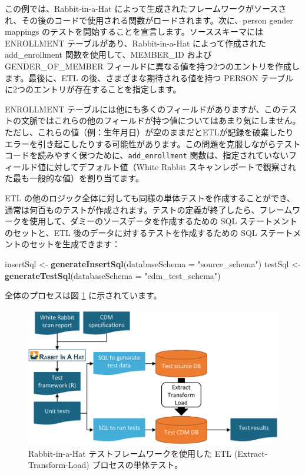 \documentclass[
  11pt]{book}
\newenvironment{Shaded}{\begin{snugshade}}{\end{snugshade}}
\newcommand{\AttributeTok}[1]{\textcolor[rgb]{0.13,0.29,0.53}{#1}}
\newcommand{\FunctionTok}[1]{\textcolor[rgb]{0.13,0.29,0.53}{\textbf{#1}}}
\newcommand{\NormalTok}[1]{#1}
\newcommand{\OtherTok}[1]{\textcolor[rgb]{0.56,0.35,0.01}{#1}}
\newcommand{\StringTok}[1]{\textcolor[rgb]{0.31,0.60,0.02}{#1}}
\theoremstyle{definition}
\theoremstyle{definition}
\theoremstyle{definition}
\theoremstyle{definition}
\theoremstyle{remark}
\begin{document}
この例では、Rabbit-in-a-Hat によって生成されたフレームワークがソースされ、その後のコードで使用される関数がロードされます。次に、person gender mappings のテストを開始することを宣言します。ソーススキーマには ENROLLMENT テーブルがあり、Rabbit-in-a-Hat によって作成された add\_enrollment 関数を使用して、MEMBER\_ID および GENDER\_OF\_MEMBER フィールドに異なる値を持つ2つのエントリを作成します。最後に、ETL の後、さまざまな期待される値を持つ PERSON テーブルに2つのエントリが存在することを指定します。

ENROLLMENT テーブルには他にも多くのフィールドがありますが、このテストの文脈ではこれらの他のフィールドが持つ値についてはあまり気にしません。ただし、これらの値（例：生年月日）が空のままだとETLが記録を破棄したりエラーを引き起こしたりする可能性があります。この問題を克服しながらテストコードを読みやすく保つために、\texttt{add\_enrollment} 関数は、指定されていないフィールド値に対してデフォルト値（White Rabbit スキャンレポートで観察された最も一般的な値）を割り当てます。

ETL の他のロジック全体に対しても同様の単体テストを作成することができ、通常は何百ものテストが作成されます。テストの定義が終了したら、フレームワークを使用して、ダミーのソースデータを作成するための SQL ステートメントのセットと、ETL 後のデータに対するテストを作成するための SQL ステートメントのセットを生成できます：

\begin{Shaded}
\begin{Highlighting}[]
\NormalTok{insertSql }\OtherTok{\textless{}{-}} \FunctionTok{generateInsertSql}\NormalTok{(}\AttributeTok{databaseSchema =} \StringTok{"source\_schema"}\NormalTok{)}
\NormalTok{testSql }\OtherTok{\textless{}{-}} \FunctionTok{generateTestSql}\NormalTok{(}\AttributeTok{databaseSchema =} \StringTok{"cdm\_test\_schema"}\NormalTok{)}
\end{Highlighting}
\end{Shaded}

全体のプロセスは図 \ref{fig:testFramework} に示されています。

\begin{figure}

{\centering \includegraphics[width=0.9\linewidth]{images/DataQuality/testFramework} 

}

\caption{Rabbit-in-a-Hat テストフレームワークを使用した ETL (Extract-Transform-Load) プロセスの単体テスト。}\label{fig:testFramework}
\end{figure}
\end{document}

